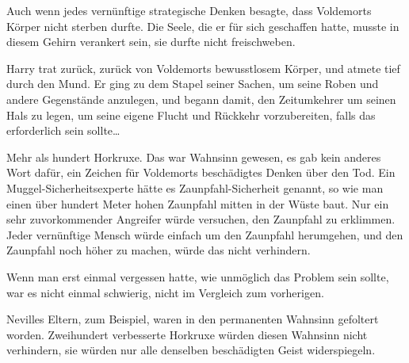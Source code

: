 Auch wenn jedes vernünftige strategische Denken besagte, dass Voldemorts Körper nicht sterben durfte. Die Seele, die er für sich geschaffen hatte, musste in diesem Gehirn verankert sein, sie durfte nicht freischweben.

Harry trat zurück, zurück von Voldemorts bewusstlosem Körper, und atmete tief durch den Mund. Er ging zu dem Stapel seiner Sachen, um seine Roben und andere Gegenstände anzulegen, und begann damit, den Zeitumkehrer um seinen Hals zu legen, um seine eigene Flucht und Rückkehr vorzubereiten, falls das erforderlich sein sollte…

Mehr als hundert Horkruxe.
Das war Wahnsinn gewesen, es gab kein anderes Wort dafür, ein Zeichen für Voldemorts beschädigtes Denken über den Tod. Ein Muggel-Sicherheitsexperte hätte es Zaunpfahl-Sicherheit genannt, so wie man einen über hundert Meter hohen Zaunpfahl mitten in der Wüste baut. Nur ein sehr zuvorkommender Angreifer würde versuchen, den Zaunpfahl zu erklimmen. Jeder vernünftige Mensch würde einfach um den Zaunpfahl herumgehen, und den Zaunpfahl noch höher zu machen, würde das nicht verhindern.

Wenn man erst einmal vergessen hatte, wie unmöglich das Problem sein sollte, war es nicht einmal schwierig, nicht im Vergleich zum vorherigen.

Nevilles Eltern, zum Beispiel, waren in den permanenten Wahnsinn gefoltert worden. Zweihundert verbesserte Horkruxe würden diesen Wahnsinn nicht verhindern, sie würden nur alle denselben beschädigten Geist widerspiegeln.

